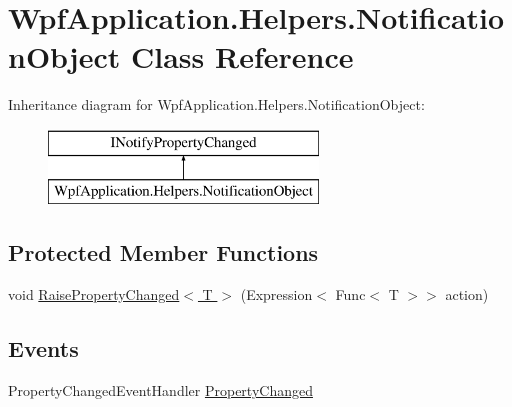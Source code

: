\hypertarget{class_wpf_application_1_1_helpers_1_1_notification_object}{\section{Wpf\-Application.\-Helpers.\-Notification\-Object Class Reference}
\label{class_wpf_application_1_1_helpers_1_1_notification_object}
}
Inheritance diagram for Wpf\-Application.\-Helpers.\-Notification\-Object\-:\begin{figure}[H]
\begin{center}
\leavevmode
\includegraphics[height=2.000000cm]{class_wpf_application_1_1_helpers_1_1_notification_object}
\end{center}
\end{figure}
\subsection*{Protected Member Functions}
\begin{DoxyCompactItemize}
\item 
void \hyperlink{class_wpf_application_1_1_helpers_1_1_notification_object_ab671378a81112fc5a7270f83154c5ca9}{Raise\-Property\-Changed$<$ T $>$} (Expression$<$ Func$<$ T $>$$>$ action)
\end{DoxyCompactItemize}
\subsection*{Events}
\begin{DoxyCompactItemize}
\item 
Property\-Changed\-Event\-Handler \hyperlink{class_wpf_application_1_1_helpers_1_1_notification_object_a8cc654b2aceffe0471fea574dcd365e1}{Property\-Changed}
\end{DoxyCompactItemize}


